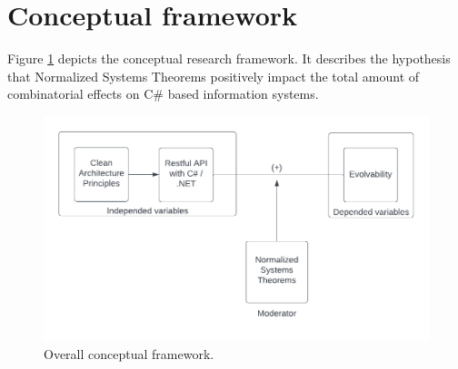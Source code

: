 \section{Conceptual framework} 
\label{conceptualframework}

Figure \ref{fig:overall_conceptual_framework} depicts the conceptual research framework.
It describes the hypothesis that Normalized Systems Theorems positively impact
the total amount of combinatorial effects on C\# based information systems.

\begin{figure}[!ht]
    \centering
    \includegraphics[width=1\textwidth]{Figures/overall_conceptual_framework}
    \caption[Overall conceptual framework]{Overall conceptual framework.}
    \label{fig:overall_conceptual_framework}
\end{figure}
